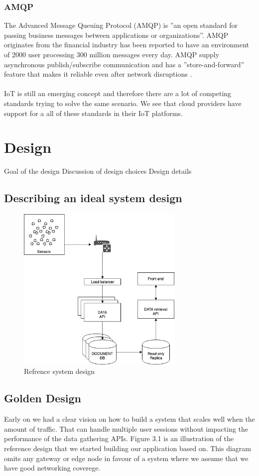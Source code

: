 \documentclass[]{uiophd}
\begin{document}
\subsection{AMQP}
The Advanced Message Queuing Protocol (AMQP) is ''an open standard for passing business messages between applications or organizations''\cite{amqp}. AMQP originates from the financial industry has been reported to have an environment of 2000 user processing 300 million messages every day. AMQP supply asynchronous publish/subscribe communication and has a ''store-and-forward'' feature that makes it reliable even after network disruptions \cite{karagiannis2015survey}. 
\\\\
IoT is still an emerging concept and therefore there are a lot of competing standards trying to solve the same scenario. We see that cloud providers have support for a all of these standards in their IoT platforms.

\chapter{Design}

Goal of the design
Discussion of design choices
Design details

\section{Describing an ideal system design}
\begin{figure}[h]
\caption{Refrence system design}
\centering
\includegraphics[width=8cm]{ideal_system_design.png}

\end{figure}
\section{Golden Design}
Early on we had a clear vision on how to build a system that scales well when the amount of traffic. That can handle multiple user sessions without impacting the performance of the data gathering APIs. Figure 3.1 is an illustration of the reference design that we started building our application based on. This diagram omits any gateway or edge node in favour of a system where we assume that we have good networking coverege.
\end{document}
